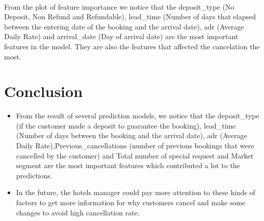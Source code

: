 \documentclass[11pt]{article}
\begin{document}
    \begin{center}
    \end{center}
    { \hspace*{\fill} \\}
    
    From the plot of feature importance we notice that the deposit\_type (No
Deposit, Non Refund and Refundable), lead\_time (Number of days that
elapsed between the entering date of the booking and the arrival date),
adr (Average Daily Rate) and arrival\_date (Day of arrival date) are the
most important features in the model. They are also the features that
affected the cancelation the most.

    \hypertarget{conclusion}{%
\section{Conclusion}\label{conclusion}}

    \begin{itemize}
\item
  From the result of several prediction models, we notice that the
  deposit\_type (if the customer made a deposit to guarantee the
  booking), lead\_time (Number of days between the booking and the
  arrival date), adr (Average Daily Rate),Previous\_cancellations
  (number of previous bookings that were cancelled by the customer) and
  Total number of special request and Market segment are the most
  important features which contributed a lot to the predictions.
\item
  In the future, the hotels manager could pay more attention to these
  kinds of factors to get more information for why customers cancel and
  make some changes to avoid high cancellation rate.
\end{itemize}


    
    
    
\end{document}

